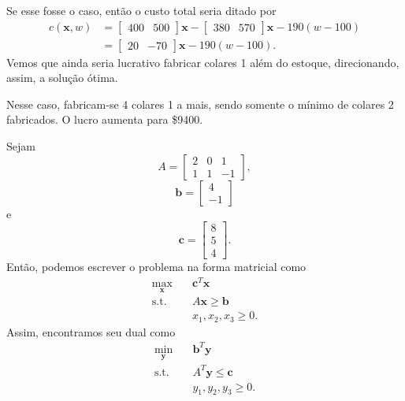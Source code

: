 \documentclass[a4paper]{report}
\begin{document}
Se esse fosse o caso, então o custo total seria ditado por
\begin{align*}
    c\left( \bm{x}, w \right) &= \begin{bmatrix} 400 & 500 \end{bmatrix} \bm{x} -\begin{bmatrix} 380 & 570 \end{bmatrix} \bm{x} - 190 \left( w-100 \right)  \\
    &= \begin{bmatrix} 20 & -70 \end{bmatrix} \bm{x} - 190\left( w-100 \right) 
.\end{align*}
Vemos que ainda seria lucrativo fabricar colares 1 além do estoque, direcionando, assim, a solução ótima.


Nesse caso, fabricam-se 4 colares 1 a mais, sendo somente o mínimo de colares 2 fabricados. O lucro aumenta para \$9400.



Sejam \[
    A = \begin{bmatrix}
	2 & 0 & 1 \\
	1 & 1 & -1
    \end{bmatrix} 
,\] \[
\bm{b} = \begin{bmatrix} 
    4 \\
    -1
\end{bmatrix} 
\] e \[
\bm{c} = \begin{bmatrix} 
    8 \\
    5 \\
    4
\end{bmatrix} 
.\] Então, podemos escrever o problema na forma matricial como
\begin{align*}
    \max_{\bm{x}} \quad & \bm{c}^{T}\bm{x} \\
    \textrm{s.t.} \quad & A\bm{x} \ge \bm{b} \\
      & x_1,x_2,x_3 \ge 0
.\end{align*}
Assim, encontramos seu dual como
\begin{align*}
    \min_{\bm{y}} \quad & \bm{b}^{T} \bm{y} \\
    \textrm{s.t.} \quad & A^{T}\bm{y} \le \bm{c} \\
      & y_1,y_2,y_3 \ge 0
.\end{align*}
\end{document}
